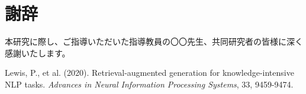 \documentclass[12pt]{bxjsreport}
\begin{document}
\chapter*{謝辞}
本研究に際し、ご指導いただいた指導教員の〇〇先生、共同研究者の皆様に深く感謝いたします。

\begin{thebibliography}{99}
Lewis, P., et al. (2020). Retrieval-augmented generation for knowledge-intensive NLP tasks. \textit{Advances in Neural Information Processing Systems}, 33, 9459-9474.
\end{thebibliography}
\end{document}
